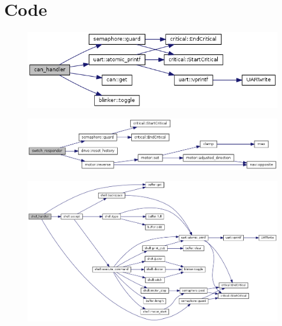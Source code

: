 \documentclass[12pt]{article}
\begin{document}
\newpage
\section{Code}
\label{sec:code}








\begin{figure}[H]
  \includegraphics[width=\textwidth]{./img/motor_can_handler.png}
\end{figure}

\begin{figure}[H]
  \includegraphics[width=\textwidth]{./img/switch_responder.png}
\end{figure}

\begin{figure}[H]
  \includegraphics[width=\textwidth]{./img/shell_handler.png}
\end{figure}
\end{document}
